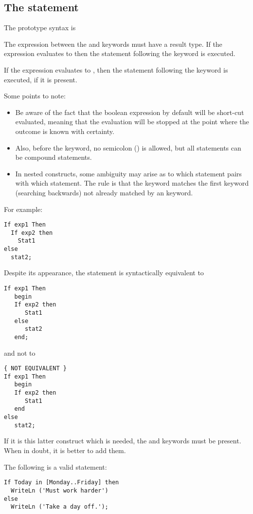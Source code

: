 \subsection{The  statement}
The  prototype syntax is

The expression between the  and  keywords must have a
 result type. If the expression evaluates to  then the
statement following the  keyword is executed.

If the expression evaluates to , then the statement following
the  keyword is executed, if it is present.

Some points to note:
\begin{itemize}
\item
Be aware of the fact that the boolean expression by default will be
short-cut evaluated, meaning that the evaluation will be stopped at
the point where the  outcome is known with certainty.
\item
Also, before the  keyword, no semicolon (\var{;}) is allowed,
but all statements can be compound statements.
\item
In nested  constructs, some ambiguity may arise as
to which   statement pairs with which  statement. The rule
is that the  keyword matches the first  keyword
(searching backwards) not already matched by an  keyword.
\end{itemize}
For example:
\begin{verbatim}
If exp1 Then
  If exp2 then
    Stat1
else
  stat2;
\end{verbatim}
Despite its appearance, the statement is syntactically equivalent to
\begin{verbatim}
If exp1 Then
   begin
   If exp2 then
      Stat1
   else
      stat2
   end;
\end{verbatim}
and not to
\begin{verbatim}
{ NOT EQUIVALENT }
If exp1 Then
   begin
   If exp2 then
      Stat1
   end
else
   stat2;
\end{verbatim}
If it is this latter construct which is needed, the  and 
keywords must be present. When in doubt, it is better to add them.

The following is a valid statement:
\begin{verbatim}
If Today in [Monday..Friday] then
  WriteLn ('Must work harder')
else
  WriteLn ('Take a day off.');
\end{verbatim}

